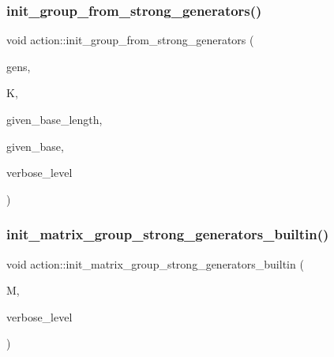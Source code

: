 \subsubsection{\texorpdfstring{init\+\_\+group\+\_\+from\+\_\+strong\+\_\+generators()}{init\_group\_from\_strong\_generators()}}
{\footnotesize\ttfamily void action\+::init\+\_\+group\+\_\+from\+\_\+strong\+\_\+generators (\begin{DoxyParamCaption}\item[{\mbox{\hyperlink{classvector__ge}{vector\+\_\+ge}} $\ast$}]{gens,  }\item[{\mbox{\hyperlink{classsims}{sims}} $\ast$}]{K,  }\item[{\mbox{\hyperlink{galois_8h_a09fddde158a3a20bd2dcadb609de11dc}{I\+NT}}}]{given\+\_\+base\+\_\+length,  }\item[{\mbox{\hyperlink{galois_8h_a09fddde158a3a20bd2dcadb609de11dc}{I\+NT}} $\ast$}]{given\+\_\+base,  }\item[{\mbox{\hyperlink{galois_8h_a09fddde158a3a20bd2dcadb609de11dc}{I\+NT}}}]{verbose\+\_\+level }\end{DoxyParamCaption})}

\mbox{\label{classaction_a0fe9c6af56f4c0826ddec07cb8605ee4}} 
\subsubsection{\texorpdfstring{init\+\_\+matrix\+\_\+group\+\_\+strong\+\_\+generators\+\_\+builtin()}{init\_matrix\_group\_strong\_generators\_builtin()}}
{\footnotesize\ttfamily void action\+::init\+\_\+matrix\+\_\+group\+\_\+strong\+\_\+generators\+\_\+builtin (\begin{DoxyParamCaption}\item[{\mbox{\hyperlink{classmatrix__group}{matrix\+\_\+group}} $\ast$}]{M,  }\item[{\mbox{\hyperlink{galois_8h_a09fddde158a3a20bd2dcadb609de11dc}{I\+NT}}}]{verbose\+\_\+level }\end{DoxyParamCaption})}

\mbox{\label{classaction_a2cfe124956ed67d8b7a927bb44847cc2}} 
